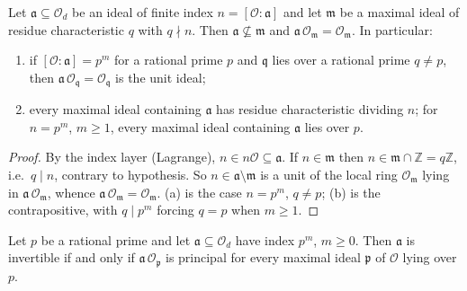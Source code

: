 \begin{lemma}\label{infra-invertibility-away}
  Let $\mathfrak{a} \subseteq \mathcal{O}_d$ be an ideal of finite index
  $n = [\mathcal{O} : \mathfrak{a}]$ and let $\mathfrak{m}$ be a maximal ideal
  of residue characteristic $q$ with $q \nmid n$. Then
  $\mathfrak{a} \not\subseteq \mathfrak{m}$ and
  $\mathfrak{a} \, \mathcal{O}_{\mathfrak{m}} = \mathcal{O}_{\mathfrak{m}}$.
  In particular:
  \begin{enumerate}
    \item[(a)] if $[\mathcal{O} : \mathfrak{a}] = p^m$ for a rational prime $p$
      and $\mathfrak{q}$ lies over a rational prime $q \neq p$, then
      $\mathfrak{a} \, \mathcal{O}_{\mathfrak{q}} = \mathcal{O}_{\mathfrak{q}}$
      is the unit ideal;
    \item[(b)] every maximal ideal containing $\mathfrak{a}$ has residue
      characteristic dividing $n$; for $n = p^m$, $m \geq 1$, every maximal
      ideal containing $\mathfrak{a}$ lies over $p$.
  \end{enumerate}
\end{lemma}

\begin{proof}
  By the index layer (Lagrange), $n \in n \mathcal{O} \subseteq \mathfrak{a}$.
  If $n \in \mathfrak{m}$ then $n \in \mathfrak{m} \cap \mathbb{Z} = q\mathbb{Z}$,
  i.e.\ $q \mid n$, contrary to hypothesis. So
  $n \in \mathfrak{a} \setminus \mathfrak{m}$ is a unit of the local ring
  $\mathcal{O}_{\mathfrak{m}}$ lying in
  $\mathfrak{a}\,\mathcal{O}_{\mathfrak{m}}$, whence
  $\mathfrak{a}\,\mathcal{O}_{\mathfrak{m}} = \mathcal{O}_{\mathfrak{m}}$.
  (a) is the case $n = p^m$, $q \neq p$; (b) is the contrapositive, with
  $q \mid p^m$ forcing $q = p$ when $m \geq 1$.
\end{proof}

\begin{corollary}
  \label{infra-invertibility-local-at-p}
  Let $p$ be a rational prime and let $\mathfrak{a} \subseteq \mathcal{O}_d$
  have index $p^m$, $m \geq 0$. Then
  $\mathfrak{a}$ is invertible if and only if
  $\mathfrak{a}\,\mathcal{O}_{\mathfrak{p}}$ is principal for every maximal
  ideal $\mathfrak{p}$ of $\mathcal{O}$ lying over $p$.
\end{corollary}

